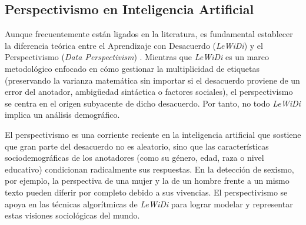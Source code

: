 \subsection{Perspectivismo en Inteligencia Artificial}
\label{subsec:PerspectivismoEnInteligenciaArtificial}
Aunque frecuentemente están ligados en la literatura, es fundamental establecer la diferencia teórica entre el Aprendizaje con Desacuerdo (\textit{LeWiDi}) y el Perspectivismo (\textit{Data Perspectivism}) \cite{basile2021we}. Mientras que \textit{LeWiDi} es un marco metodológico enfocado en cómo gestionar la multiplicidad de etiquetas (preservando la varianza matemática sin importar si el desacuerdo proviene de un error del anotador, ambigüedad sintáctica o factores sociales), el perspectivismo se centra en el origen subyacente de dicho desacuerdo. Por tanto, no todo \textit{LeWiDi} implica un análisis demográfico. 

El perspectivismo es una corriente reciente en la inteligencia artificial que sostiene que gran parte del desacuerdo no es aleatorio, sino que las características sociodemográficas de los anotadores (como su género, edad, raza o nivel educativo) condicionan radicalmente sus respuestas. En la detección de sexismo, por ejemplo, la perspectiva de una mujer y la de un hombre frente a un mismo texto pueden diferir por completo debido a sus vivencias. El perspectivismo se apoya en las técnicas algorítmicas de \textit{LeWiDi} para lograr modelar y representar estas visiones sociológicas del mundo. 

